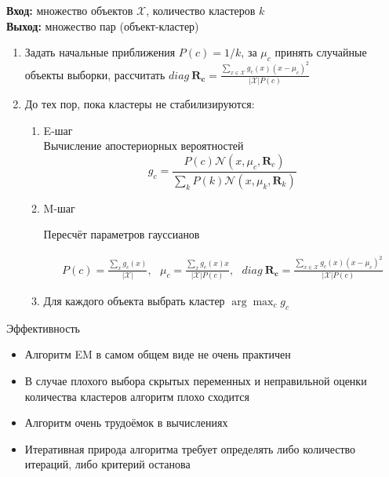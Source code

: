\documentclass[compress,unicode]{beamer}
\begin{document}
\begin{frame}{}
\begin{block}{}
\footnotesize
{\bf\color{main}Вход:} множество объектов $\mathcal{X}$, количество кластеров $k$\\
{\bf\color{main}Выход:} множество пар (объект-кластер) \\
\begin{enumerate}
\item Задать начальные приближения $P(c) = 1/k$, за $\mu_c$ принять случайные объекты выборки, рассчитать $diag~\mathbf{R_c} = \frac{\sum_{x \in \mathcal{X}} g_c (x)  (x- \mu_c)^2}{|\mathcal{X}| P(c)} $
\item До тех пор, пока кластеры не стабилизируются:
\begin{enumerate}
\footnotesize
\item E-шаг\\
{
\color{main!30!black}Вычисление апостериорных вероятностей
$$
g_c = \frac{P(c) \mathcal{N} (x,\mu_c, \mathbf{R}_c)}{\sum_k P(k) \mathcal{N}(x,\mu_k,\mathbf{R}_k)}
$$
}
\item M-шаг\\
{\footnotesize
\color{main!30!black}Пересчёт параметров гауссианов

\begin{multline*}
P(c) = \frac{\sum_x g_c (x)}{|\mathcal{X}|} , ~~~
 \mu_c = \frac{\sum_x g_c (x) x}{|\mathcal{X}| P(c)}    ,~~~ diag~\mathbf{R_c} = \frac{\sum_{x \in \mathcal{X}} g_c (x)  (x- \mu_c)^2}{|\mathcal{X}| P(c)} 
\end{multline*}
}
\item Для каждого объекта выбрать кластер $\arg \max_c g_c$
\end{enumerate}
\end{enumerate}
\end{block}
\end{frame}

\begin{frame}{Эффективность}
\begin{itemize}
	\item Алгоритм EM в самом общем виде не очень практичен
	\item В случае плохого выбора скрытых переменных и неправильной оценки количества кластеров алгоритм плохо сходится
	\item Алгоритм очень трудоёмок в вычислениях
	\item Итеративная природа алгоритма требует определять либо количество итераций, либо критерий останова
\end{itemize}
\end{frame}
\end{document}
